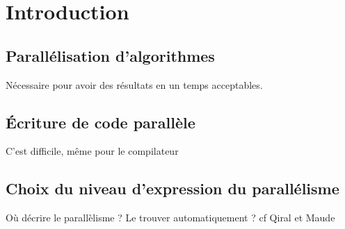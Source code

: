 
\chapter{Introduction}


\section{Parallélisation d'algorithmes}

Nécessaire pour avoir des résultats en un temps acceptables.

\section{\'Ecriture de code parallèle}

C'est difficile, même pour le compilateur

\section{Choix du niveau d'expression du parallélisme}

Où décrire le parallèlisme ? Le trouver automatiquement ?
cf Qiral et Maude

